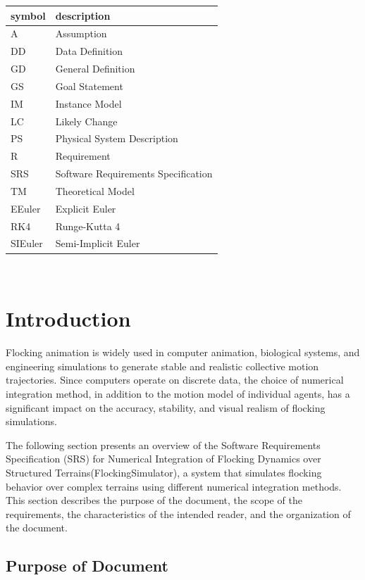 \documentclass[12pt]{article}
\begin{document}
\renewcommand{\arraystretch}{1.2}
\begin{tabular}{l l} 
  \toprule		
  \textbf{symbol} & \textbf{description}\\
  \midrule 
  A & Assumption\\
  DD & Data Definition\\
  GD & General Definition\\
  GS & Goal Statement\\
  IM & Instance Model\\
  LC & Likely Change\\
  PS & Physical System Description\\
  R & Requirement\\
  SRS & Software Requirements Specification\\
  TM & Theoretical Model\\
  EEuler & Explicit Euler\\
  RK4 & Runge-Kutta 4\\
  SIEuler & Semi-Implicit Euler\\
  \bottomrule
\end{tabular}\\

\section{Introduction}

Flocking animation is widely used in computer animation, biological systems, 
and engineering simulations to generate stable and realistic collective motion 
trajectories. Since computers operate on discrete data, the choice of numerical 
integration method, in addition to the motion model of individual agents, has a 
significant impact on the accuracy, stability, and visual realism of flocking 
simulations.

The following section presents an overview of the Software Requirements 
Specification (SRS) for Numerical Integration of Flocking Dynamics over 
Structured Terrains(FlockingSimulator), a system that simulates flocking 
behavior over complex terrains using different numerical integration methods. 
This section describes the purpose of the document, the scope of the 
requirements, the characteristics of the intended reader, and the organization 
of the document.

\subsection{Purpose of Document}
\end{document}
